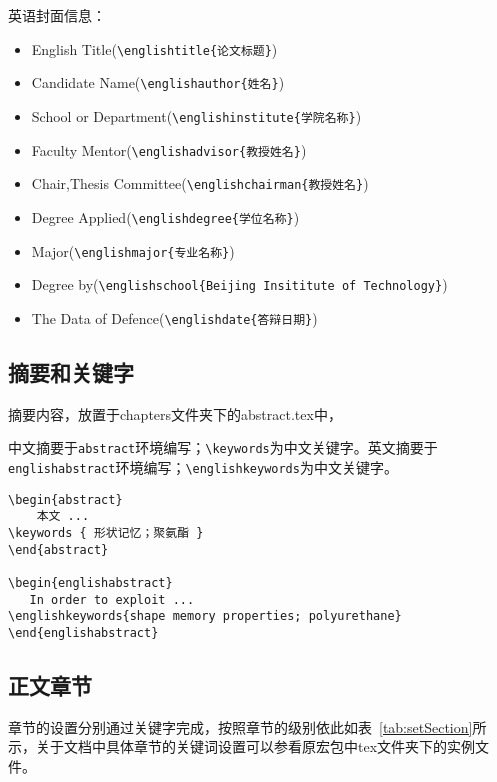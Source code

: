 英语封面信息：
\begin{itemize}
\item English Title(\verb|\englishtitle{论文标题}|)
\item Candidate Name(\verb|\englishauthor{姓名}|)
\item School or Department(\verb|\englishinstitute{学院名称}|)
\item Faculty Mentor(\verb|\englishadvisor{教授姓名}|)
\item Chair,Thesis Committee(\verb|\englishchairman{教授姓名}|)
\item Degree Applied(\verb|\englishdegree{学位名称}|)
\item Major(\verb|\englishmajor{专业名称}|)
\item Degree by(\verb|\englishschool{Beijing Insititute of Technology}|)
\item The Data of Defence(\verb|\englishdate{答辩日期}|)
\end{itemize}

\subsection{摘要和关键字}
摘要内容，放置于chapters文件夹下的abstract.tex中，

中文摘要于\verb|abstract|环境编写；\verb|\keywords|为中文关键字。英文摘要于\verb|englishabstract|环境编写；\verb|\englishkeywords|为中文关键字。

\begin{lstlisting}[language={[LaTeX]TeX}, caption={中英文摘要}]
\begin{abstract}
	本文 ...
\keywords { 形状记忆；聚氨酯 }
\end{abstract}

\begin{englishabstract}
   In order to exploit ...
\englishkeywords{shape memory properties; polyurethane}
\end{englishabstract}
\end{lstlisting}


\subsection{正文章节}
章节的设置分别通过关键字完成，按照章节的级别依此如表~\ref{tab:setSection}所示，关于文档中具体章节的关键词设置可以参看原宏包中tex文件夹下的实例文件。

